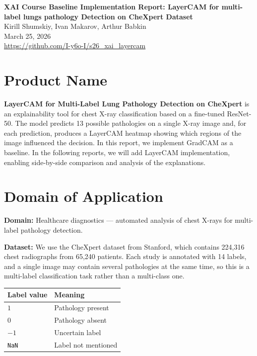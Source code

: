 \documentclass[12pt]{article}
\begin{document}
\begin{center}
    {\LARGE \textbf{XAI Course Baseline Implementation Report: LayerCAM for multi-label lungs pathology Detection on CheXpert Dataset}} \\[1.2em]
    {\large Kirill Shumskiy, Ivan Makarov, Arthur Babkin} \\[0.6em]
    {\large March 25, 2026} \\[0.4em]
    {\small \url{https://github.com/I-y6o-I/s26_xai_layercam}}
\end{center}

\section{Product Name}

\textbf{LayerCAM for Multi-Label Lung Pathology Detection on CheXpert} is an explainability tool for chest X-ray classification based on a fine-tuned ResNet-50. The model predicts 13 possible pathologies on a single X-ray image and, for each prediction, produces a LayerCAM heatmap showing which regions of the image influenced the decision. In this report, we implement GradCAM as a baseline. In the following reports, we will add LayerCAM implementation, enabling side-by-side comparison and analysis of the explanations.

\section{Domain of Application}

\textbf{Domain:} Healthcare diagnostics --- automated analysis of chest X-rays for multi-label pathology detection.

\textbf{Dataset:} We use the CheXpert dataset from Stanford, which contains 224,316 chest radiographs from 65,240 patients. Each study is annotated with 14 labels, and a single image may contain several pathologies at the same time, so this is a multi-label classification task rather than a multi-class one.

\begin{center}
\begin{tabular}{ll}
\toprule
\textbf{Label value} & \textbf{Meaning} \\
\midrule
$1$          & Pathology present \\
$0$          & Pathology absent \\
$-1$         & Uncertain label \\
\texttt{NaN} & Label not mentioned \\
\bottomrule
\end{tabular}
\end{center}
\end{document}
